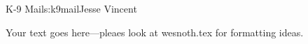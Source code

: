 \begin{aosachapter}{K-9 Mail}{s:k9mail}{Jesse Vincent}

Your text goes here---pleaes look at wesnoth.tex for formatting ideas.

\end{aosachapter}
